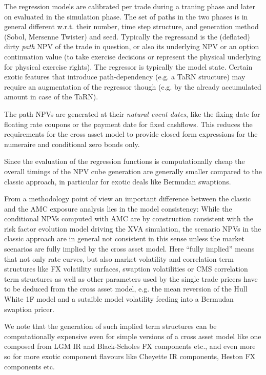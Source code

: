 \documentclass[12pt, a4paper]{article}
\begin{document}
The regression models are calibrated per trade during a traning phase and later on evaluated in the simulation
phase. The set of paths in the two phases is in general different w.r.t. their number, time step structure, and
generation method (Sobol, Mersenne Twister) and seed. Typically the regressand is the (deflated) dirty {\em path} NPV of
the trade in question, or also its underlying NPV or an option continuation value (to take exercise decisions or
represent the physical underlying for physical exercise rights). The regressor is typically the model state. Certain
exotic features that introduce path-dependency (e.g. a TaRN structure) may require an augmentation of the regressor
though (e.g. by the already accumulated amount in case of the TaRN).

The path NPVs are generated at their {\em natural event dates}, like the fixing date for floating rate coupons or the
payment date for fixed cashflows. This reduces the requirements for the cross asset model to provide closed form
expressions for the numeraire and conditional zero bonds only.

Since the evaluation of the regression functions is computationally cheap the overall timings of the NPV cube generation
are generally smaller compared to the classic approach, in particular for exotic deals like Bermudan swaptions.

From a methodology point of view an important difference between the classic and the AMC exposure analysis lies in the
model consistency: While the conditional NPVs computed with AMC are by construction consistent with the risk factor
evolution model driving the XVA simulation, the scenario NPVs in the classic approach are in general not consistent in
this sense unless the market scenarios are fully implied by the cross asset model. Here ``fully implied'' means that not
only rate curves, but also market volatility and correlation term structures like FX volatility surfaces, swaption
volatilities or CMS correlation term structures as well as other parameters used by the single trade pricers have to be
deduced from the cross asset model, e.g. the mean reversion of the Hull White 1F model and a sutaible model volatility
feeding into a Bermudan swaption pricer.

We note that the generation of such implied term structures can be computationally expensive even for simple versions of
a cross asset model like one composed from LGM IR and Black-Scholes FX components etc., and even more so for more exotic
component flavours like Cheyette IR components, Heston FX components etc.
\end{document}
